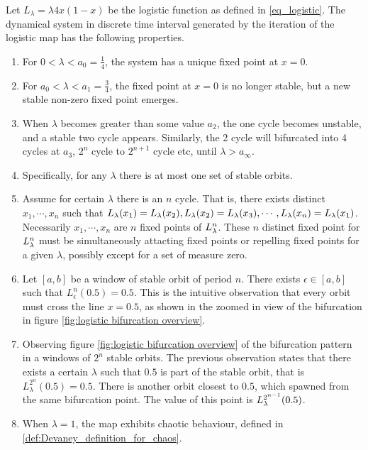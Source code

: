 \begin{observation}\label{th:logistic_bifurcation}
	Let $L_{\lambda} = \lambda 4x(1-x) $ be the logistic function as defined in \ref{eq_logistic}.
	The dynamical system in discrete time interval generated by the iteration of the logistic map has the following properties.

	\begin{enumerate}
		\item For $0 < \lambda < a_0 = \frac{1}{4}$, the system has a unique fixed point at $x = 0$. \label{log_fix_0}

		\item For $a_0 <\lambda < a_1 = \frac{3}{4}$, the fixed point at $x=0$ is no longer stable, but a new stable non-zero fixed point emerges. \label{log_fix_1}

		\item When $\lambda$ becomes greater than some value $a_2$, the one cycle becomes unstable, and a stable two cycle appears. 
		Similarly, the 2 cycle will bifurcated into 4 cycles at $a_3$, $2^n$ cycle to $2^{n+1}$ cycle etc, until $\lambda > a_{\infty}$. 
		\label{log_periodic_doubling}
		\item Specifically, for any $\lambda$ there is at most one set of stable orbits. \label{log_at_most_one_stable_orbit}

		\item \label{log_simul_stable_or_unstable}
		Assume for certain $\lambda$ there is an $n$ cycle. That is, there exists distinct $x_1, \cdots, x_n$ such that $L_{\lambda}(x_1) = L_{\lambda}(x_2), L_{\lambda}(x_2) = L_{\lambda}(x_3), \cdots, L_{\lambda}(x_n) = L_{\lambda}(x_1)$.
		Necessarily $x_1, \cdots, x_n$ are $n$ fixed points of $L_{\lambda}^n$. 
		These $n$ distinct fixed point for $L_{\lambda}^n$ must be simultaneously attacting fixed points or repelling fixed points for a given $\lambda$, possibly except for a set of measure zero.

		\item \label{log_cross_half} 
		Let $[a, b]$ be a window of stable orbit of period $n$.
		There exists $\epsilon \in [a, b]$ such that $L_{\epsilon}^n(0.5) = 0.5$. 
		This is the intuitive observation that every orbit must cross the line $x = 0.5$, as shown in the zoomed in view of the bifurcation in figure \ref{fig:logistic bifurcation overview}.

		\item \label{log_closest_branch}
		Observing figure \ref{fig:logistic bifurcation overview} of the bifurcation pattern in a windows of $2^n$ stable orbits. 
		The previous observation states that there exists a certain $\lambda$ such that $0.5$ is part of the stable orbit, that is $L_{\lambda}^{2^n}(0.5) = 0.5$.
		There is another orbit closest to $0.5$, which spawned from the same bifurcation point.
		The value of this point is $L_{\lambda}^{2^{n-1}}(0.5)$.


		\item  \label{log_chaos_at_1}
			When $\lambda = 1$, the map exhibits chaotic behaviour, defined in \ref{def:Devaney_definition_for_chaos}. 
	\end{enumerate}
\end{observation}

